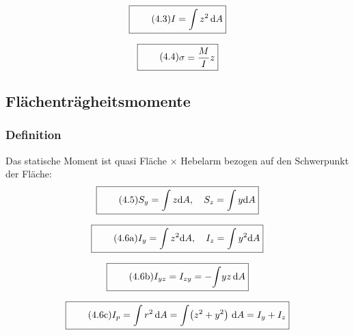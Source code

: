 \documentclass[11pt]{article}
\newcommand{\1}{ {\mathds{1}} }
\newcommand{\td}{\,\text{d}}
\begin{document}
\begin{multicols}{2}
				\begin{equation}
			\boxed{
				\tag{4.3}
				\begin{split}
					I = \int z^2 \td A
				\end{split}
			}
		\end{equation}

						\begin{equation}
			\boxed{
				\tag{4.4}
				\begin{split}
					\sigma = \frac{M}{I} z
				\end{split}
			}
		\end{equation}

		\subsection{Flächenträgheitsmomente}
		\subsubsection{Definition}

		Das statische Moment ist quasi Fläche $\times$ Hebelarm bezogen auf den Schwerpunkt der Fläche:
		\begin{equation}
			\boxed{
				\tag{4.5}
				\begin{split}
					S_y
					=
					\int z \text{d} A, \quad
					S_z
					=
					\int y \text{d} A
				\end{split}
			}
		\end{equation}

		\begin{equation}
			\boxed{
				\tag{4.6a}
				\begin{split}
					I_y
					=
					\int
					z^2\text{d}A, \quad
					I_z
					=
					\int
					y^2\text{d}A
				\end{split}
			}
		\end{equation}
		
		\begin{equation}
			\boxed{
				\tag{4.6b}
				\begin{split}
					I_{yz} = I_{zy} = -\!\int\! y z\, \text{d}A
				\end{split}
			}
		\end{equation}
		
		\begin{equation}
			\boxed{
				\tag{4.6c}
				\begin{split}
					I_p = \int r^2 \,\text{d}A = \int\! \left( z^2 + y^2  \right)\,\text{d}A = I_y + I_z
				\end{split}
			}
		\end{equation}


\end{multicols}
\end{document}
